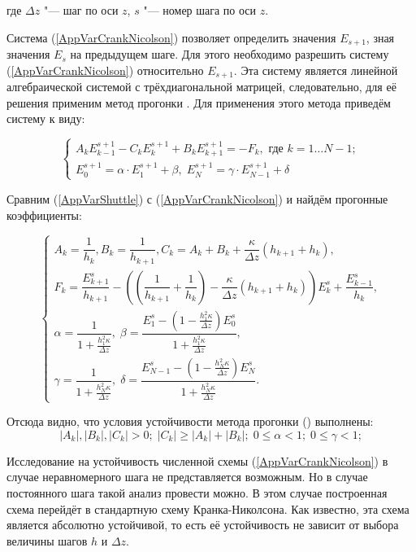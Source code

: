 \noindent где $\Delta z$ "--- шаг по оси $z$, $s$ "--- номер шага по оси $z$.

Система (\ref{AppVarCrankNicolson}) позволяет определить значения $E_{s+1}$, зная значения $E_s$ на предыдущем шаге.
Для этого необходимо разрешить систему (\ref{AppVarCrankNicolson}) относительно $E_{s+1}$. Эта систему является
линейной алгебраической системой с трёхдиагональной матрицей, следовательно,
для её решения применим метод прогонки \cite{KalitkinChM}.
Для применения этого метода приведём систему к виду:

\begin{equation}\label{AppVarShuttle}
\left\{
\begin{array}{l}
	A_k E_{k-1}^{s+1} - C_k E_k^{s+1} + B_k E_{k+1}^{s+1} = - F_k, \mbox{ где } k = 1 \ldots N-1;\\[1em]
	E_0^{s+1} = \alpha \cdot E_1^{s+1} + \beta, \; E_N^{s+1} = \gamma \cdot E_{N-1}^{s+1} + \delta
\end{array}
\right.
\end{equation}

Сравним (\ref{AppVarShuttle}) с (\ref{AppVarCrankNicolson}) и найдём прогонные коэффициенты:

\begin{equation}
\left\{
\begin{array}{l}
	A_k = \dfrac{1}{h_k}, B_k = \dfrac{1}{h_{k+1}},
	C_k = A_k + B_k + \dfrac{\kappa}{\Delta z}\left( h_{k+1} + h_k \right), \\[1em]
	F_k = \dfrac{E_{k+1}^s}{h_{k+1}} - \left(\left(\dfrac{1}{h_{k+1}} + \dfrac{1}{h_k}\right) -
	\dfrac{\kappa}{\Delta z}\left( h_{k+1} + h_k \right)\right)E_k^s + \dfrac{E_{k-1}^s}{h_k}, \\[1em]
	\alpha = \dfrac{1}{1+\frac{h_1^2\kappa}{\Delta z}}, \;
	\beta = \dfrac{E_1^s - \left(1-\frac{h_1^2\kappa}{\Delta z}\right)E_0^s}{1+\frac{h_1^2\kappa}{\Delta z}}, \\[1em]
	\gamma = \dfrac{1}{1+\frac{h_N^2\kappa}{\Delta z}}, \;
	\delta = \dfrac{E_{N-1}^s - \left(1-\frac{h_N^2\kappa}{\Delta z}\right)E_N^s}{1+\frac{h_N^2\kappa}{\Delta z}}.
\end{array}
\right.
\end{equation}

Отсюда видно, что условия устойчивости метода прогонки (\cite{KalitkinChM}) выполнены:
\begin{equation}\label{AppVarShuttleConditions}
|A_k|, |B_k|,  |C_k| > 0; \; |C_k| \geq |A_k| + |B_k|; \; 0 \leq \alpha < 1; \; 0 \leq \gamma < 1;
\end{equation}

Исследование на устойчивость численной схемы (\ref{AppVarCrankNicolson}) в случае неравномерного шага
не представляется возможным. Но в случае постоянного шага такой анализ провести можно. В этом случае
построенная схема перейдёт в стандартную схему Кранка-Николсона. Как известно, эта схема является
абсолютно устойчивой, то есть её устойчивость не зависит от выбора величины шагов $h$ и $\Delta z$.

